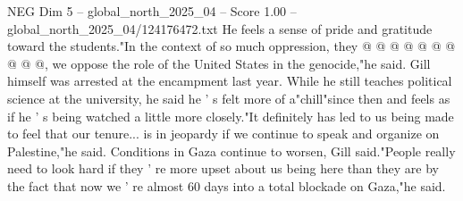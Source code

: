 \begin{textsample}{NEG Dim 5 – global\_north\_2025\_04 – Score 1.00 – global\_north\_2025\_04/124176472.txt}
He feels a sense of pride and gratitude toward the students."In the context of so much oppression, they @ @ @ @ @ @ @ @ @ @, we oppose the role of the United States in the genocide,"he said.
Gill himself was arrested at the encampment last year.
While he still teaches political science at the university, he said he ' s felt more of a"chill"since then and feels as if he ' s being watched a little more closely."It definitely has led to us being made to feel that our tenure... is in jeopardy if we continue to speak and organize on Palestine,"he said.
Conditions in Gaza continue to worsen, Gill said."People really need to look hard if they ' re more upset about us being here than they are by the fact that now we ' re almost 60 days into a total blockade on Gaza,"he said.

\end{textsample}
